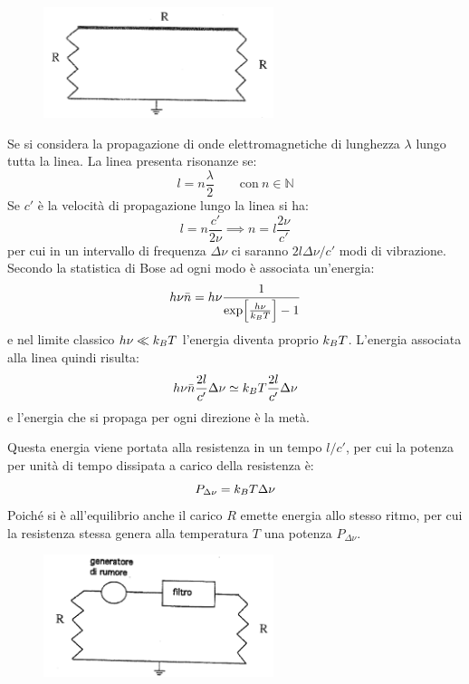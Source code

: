 \begin{figure}[b]
	\centering
	\includegraphics[width=0.6\textwidth]{Immagini/NyquistLine.png}
	\vspace{-10pt}
	\caption{}
	\label{fig:nyqline}
	\vspace{-10pt}
\end{figure}

Se si considera la propagazione di onde elettromagnetiche di lunghezza $ \lambda $ lungo tutta la linea. La linea presenta risonanze se:
\[ l = n \frac{\lambda}{2} \qquad \text{con}~n \in \mathbb{N} \]
Se $ c' $ è la velocità di propagazione lungo la linea si ha:
\[ l = n \frac{c'}{2 \nu} \implies n = l \frac{2\nu}{c'} \]
per cui in un intervallo di frequenza $ \Delta \nu $ ci saranno $ 2l \Delta \nu /c' $ modi di vibrazione.
Secondo la statistica di Bose ad ogni modo è associata un'energia:
\[ h\nu \bar{n} = h \nu \frac{1}{\exp[\frac{h\nu}{k_B T}] - 1} \]
e nel limite classico $ h\nu \ll k_B T $ l'energia diventa proprio $ k_B T $. L'energia associata alla linea quindi risulta:
\[ h\nu \bar{n} \frac{2l}{c'} \Delta\nu \simeq k_B T \frac{2l}{c'} \Delta\nu \]
e l'energia che si propaga per ogni direzione è la metà.

Questa energia viene portata alla resistenza in un tempo $ l/c' $, per cui la potenza per unità di tempo dissipata a carico della resistenza è:
\[ P_{\Delta\nu} = k_B T \Delta\nu \]
Poiché si è all'equilibrio anche il carico $ R $ emette energia allo stesso ritmo, per cui la resistenza stessa genera alla temperatura $ T $ una potenza $ P_{\Delta\nu} $.

\begin{figure}[t]
	\centering
	\includegraphics[width=0.6\textwidth]{Immagini/NyquistNoiseGenerator.png}
	\vspace{-5pt}
	\caption{}
	\label{fig:nyqgen}
	\vspace{-10pt}
\end{figure}

